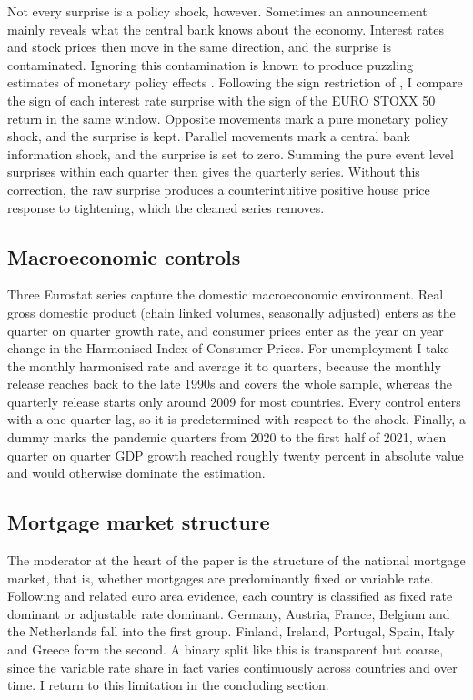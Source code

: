 Not every surprise is a policy shock, however. Sometimes an announcement
mainly reveals what the central bank knows about the economy. Interest
rates and stock prices then move in the same direction, and the surprise is
contaminated. Ignoring this contamination is known to produce puzzling
estimates of monetary policy effects
\citep{nakamura2018, mirandaagrippino2021}. Following the sign restriction
of \citet{jarocinski2020}, I
compare the sign of each interest rate surprise with the sign of the EURO
STOXX 50 return in the same window. Opposite movements mark a pure monetary
policy shock, and the surprise is kept. Parallel movements mark a central
bank information shock, and the surprise is set to zero. Summing the pure
event level surprises within each quarter then gives the quarterly series.
Without this correction, the raw surprise produces a counterintuitive
positive house price response to tightening, which the cleaned series
removes.

\subsection{Macroeconomic controls}

Three Eurostat series \citep{eurostat2026} capture the domestic
macroeconomic environment. Real
gross domestic product (chain linked volumes, seasonally adjusted) enters
as the quarter on quarter growth rate, and consumer prices enter as the
year on year change in the Harmonised Index of Consumer Prices. For
unemployment I take the monthly harmonised rate and average it to quarters,
because the monthly release reaches back to the late 1990s and covers the
whole sample, whereas the quarterly release starts only around 2009 for
most countries. Every control enters with a one quarter lag, so it is
predetermined with respect to the shock. Finally, a dummy marks the
pandemic quarters from 2020 to the first half of 2021, when quarter on
quarter GDP growth reached roughly twenty percent in absolute value and
would otherwise dominate the estimation.

\subsection{Mortgage market structure}

The moderator at the heart of the paper is the structure of the national
mortgage market, that is, whether mortgages are predominantly fixed or
variable rate. Following \citet{badarinza2018} and related euro area
evidence, each country is classified as fixed rate dominant or adjustable
rate dominant. Germany, Austria, France, Belgium and the Netherlands fall
into the first group. Finland, Ireland, Portugal, Spain, Italy and Greece
form the second. A binary split like this is transparent but coarse, since
the variable rate share in fact varies continuously across countries and
over time. I return to this limitation in the concluding section.
